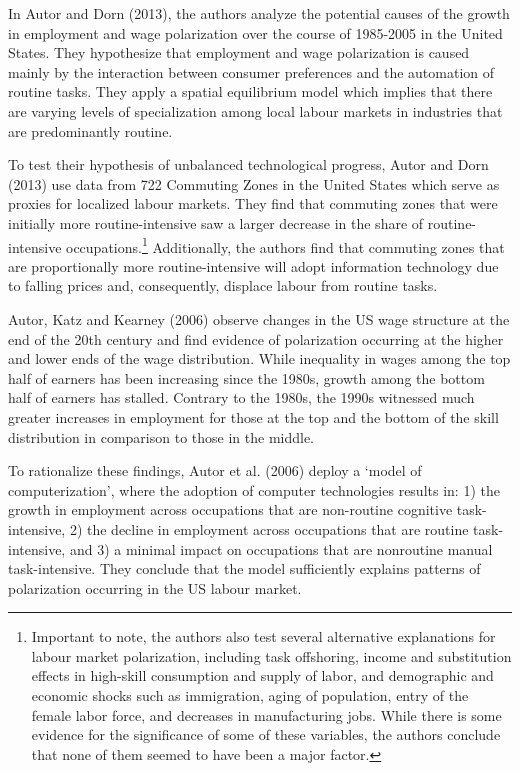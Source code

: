 \documentclass[undefended]{bumrp}
\begin{document}
In Autor and Dorn (2013), the authors analyze the potential causes of the growth in employment and wage polarization over the course of 1985-2005 in the United States. They hypothesize that employment and wage polarization is caused mainly by the interaction between consumer preferences and the automation of routine tasks. They apply a spatial equilibrium model which implies that there are varying levels of specialization among local labour markets in industries that are predominantly routine. 

To test their hypothesis of unbalanced technological progress, Autor and Dorn (2013) use data from 722 Commuting Zones in the United States which serve as proxies for localized labour markets. They find that commuting zones that were initially more routine-intensive saw a larger decrease in the share of routine-intensive occupations.\footnote{Important to note, the authors also test several alternative explanations for labour market polarization, including task offshoring, income and substitution effects in high-skill consumption and supply of labor, and demographic and economic shocks such as immigration, aging of population, entry of the female labor force, and decreases in manufacturing jobs. While there is some evidence for the significance of some of these variables, the authors conclude that none of them seemed to have been a major factor.} Additionally, the authors find that commuting zones that are proportionally more routine-intensive will adopt information technology due to falling prices and, consequently, displace labour from routine tasks.

Autor, Katz and Kearney (2006) observe changes in the US wage structure at the end of the 20th century and find evidence of polarization occurring at the higher and lower ends of the wage distribution. While inequality in wages among the top half of earners has been increasing since the 1980s, growth among the bottom half of earners has stalled. Contrary to the 1980s, the 1990s witnessed much greater increases in employment for those at the top and the bottom of the skill distribution in comparison to those in the middle.

To rationalize these findings, Autor et al. (2006) deploy a ‘model of computerization’, where the adoption of computer technologies results in: 1) the growth in employment across occupations that are non-routine cognitive task-intensive, 2) the decline in employment across occupations that are routine task-intensive, and 3) a minimal impact on occupations that are nonroutine manual task-intensive. They conclude that the model sufficiently explains patterns of polarization occurring in the US labour market.
\end{document}
